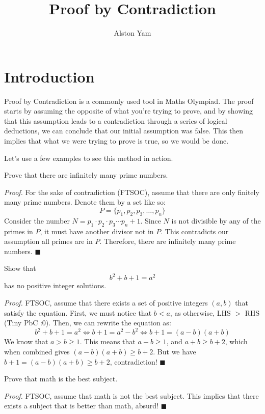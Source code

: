 \documentclass{article}
\title{Proof by Contradiction}
\author{Alston Yam}
\theoremstyle{mytheoremstyle}
\theoremstyle{mytheoremstyle}
\theoremstyle{myproblemstyle}
\theoremstyle{myproblemstyle}
\begin{document}
    \maketitle

    \section{Introduction}
        Proof by Contradiction is a commonly used tool in Maths Olympiad. The proof starts by assuming the opposite of what you're trying to prove, and by showing that this assumption leads to a contradiction through a series of logical deductions, we can conclude that our initial assumption was false. This then implies that what we were trying to prove is true, so we would be done.
        \bigskip

        Let's use a few examples to see this method in action.
        
        \begin{example}
            Prove that there are infinitely many prime numbers.
        \end{example}

        \textit{Proof.} For the sake of contradiction (FTSOC), assume that there are only finitely many prime numbers. Denote them by a set like so: \[P = \{ p_1, p_2, p_3, \dots, p_n \} \]
        Consider the number $N = p_1 \cdot p_2 \cdot p_3 \cdots p_n + 1$. Since $N$ is not divisible by any of the primes in $P$, it must have another divisor not in $P$. This contradicts our assumption all primes are in $P$. Therefore, there are infinitely many prime numbers. $\blacksquare$

        \begin{example}
            Show that \[ b^2 + b + 1 = a^2 \] has no positive integer solutions.
        \end{example}

        \textit{Proof.} FTSOC, assume that there exists a set of positive integers $(a, b)$ that satisfy the equation. First, we must notice that $b < a$, as otherwise, LHS $>$ RHS (Tiny PbC :0). Then, we can rewrite the equation as: \[ b^2 + b + 1 = a^2 \iff b + 1 = a^2 - b^2 \iff b + 1 = (a-b)(a+b) \]
        We know that $a > b \geq 1$. This means that $a - b \geq 1$, and $a + b \geq b + 2$, which when combined gives $(a-b)(a+b) \geq b+2$. But we have $b + 1 = (a-b)(a+b) \geq b+2$, contradiction! $\blacksquare$
        
        \begin{example}
            Prove that math is the best subject.
        \end{example}
        \textit{Proof.} FTSOC, assume that math is not the best subject. This implies that there exists a subject that is better than math, absurd! $\blacksquare$
\end{document}

